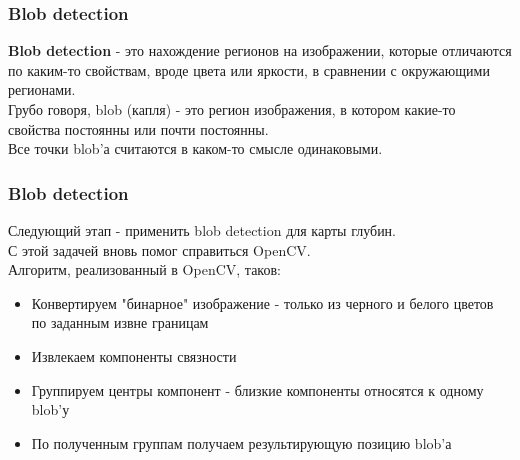\documentclass{beamer}
\begin{document}
		\begin{frame}
			\frametitle{Blob detection}
			
			\textbf{Blob detection} - это нахождение регионов на изображении,
			которые отличаются по каким-то свойствам, вроде цвета
			или яркости, в сравнении с окружающими регионами.\\
			Грубо говоря, blob (капля) - это регион изображения,
			в котором какие-то свойства постоянны или почти
			постоянны.\\
			Все точки blob'а считаются в каком-то смысле
			одинаковыми.\\
		\end{frame}
		
		\begin{frame}
			\frametitle{Blob detection}
			
			Следующий этап - применить blob detection для карты глубин.\\
			С этой задачей вновь помог справиться OpenCV.\\
			Алгоритм, реализованный в OpenCV, таков:\\
			\begin{itemize}
				\item Конвертируем "бинарное" изображение - только
					  из черного и белого цветов по заданным извне границам
				\item Извлекаем компоненты связности
				\item Группируем центры компонент - близкие компоненты относятся к одному 
				      blob'у
				\item По полученным группам получаем результирующую позицию blob'а
			\end{itemize}
		\end{frame}
\end{document}
